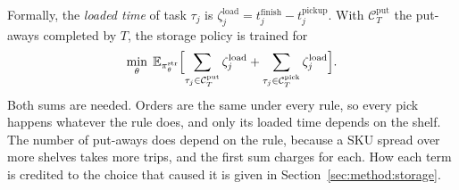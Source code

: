 Formally, the \emph{loaded time} of task $\tau_j$ is
$\zeta^{\mathrm{load}}_j = t_j^{\mathrm{finish}} - t_j^{\mathrm{pickup}}$. With
$\mathcal{C}^{\mathrm{put}}_T$ the put-aways completed by $T$, the storage
policy is trained for
\begin{equation}
  \min_{\theta}\; \mathbb{E}_{\pi^{\mathrm{str}}_\theta} \Bigl[
    \sum_{\tau_j \in \mathcal{C}^{\mathrm{put}}_T} \zeta^{\mathrm{load}}_j
    + \sum_{\tau_j \in \mathcal{C}^{\mathrm{pick}}_T} \zeta^{\mathrm{load}}_j \Bigr].
  \label{eq:storagelearning}
\end{equation}
Both sums are needed. Orders are the same under every rule, so every pick
happens whatever the rule does, and only its loaded time depends on the shelf.
The number of put-aways does depend on the rule, because a SKU spread over more
shelves takes more trips, and the first sum charges for each. How each term is
credited to the choice that caused it is given in Section~\ref{sec:method:storage}.

%
%
